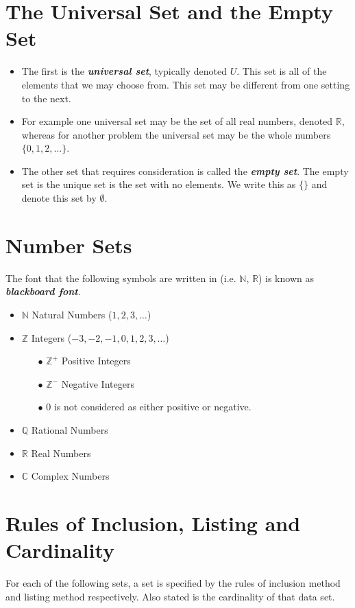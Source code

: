 \documentclass[a4paper,12pt]{article}
\begin{document}
\section*{The Universal Set and the Empty Set}
\begin{itemize}
	\item The first is the \textbf{\textit{universal set}}, typically denoted $U$. This set is all of the elements that we may choose from. This set may be different from one setting to the next. 
	
	\item For example one universal set may be the set of all real numbers, denoted $\mathbb{R}$, whereas for another problem the universal set may be the whole numbers $\{0, 1, 2,\ldots\}$.
	
	\item The other set that requires consideration is called the \textit{\textbf{empty set}}. The empty set is the unique set is the set with no elements. We write this as $\{ \}$ and denote this set by $\emptyset$.
\end{itemize}
\section*{Number Sets}
The font that the following symbols are written in (i.e. $\mathbb{N}$, $\mathbb{R}$) is known as \textit{\textbf{blackboard font}}.
\begin{itemize}
	\item $\mathbb{N}$ Natural Numbers ($1,2,3,\ldots$) 
	\item $\mathbb{Z}$ Integers ($-3,-2,-1,0,1,2,3, \ldots$)
	\begin{itemize}
		\item[$\bullet$] $\mathbb{Z}^{+}$ Positive Integers
		\item[$\bullet$] $\mathbb{Z}^{-}$ Negative Integers
		\item[$\bullet$] 0 is not considered as either positive or negative.
	\end{itemize}
	\item $\mathbb{Q}$ Rational Numbers
	\item $\mathbb{R}$ Real Numbers
	\item $\mathbb{C}$ Complex Numbers
\end{itemize}
\newpage
\section*{Rules of Inclusion, Listing and Cardinality}
For each of the following sets, a set is specified by the rules of inclusion method and listing method respectively. Also stated is the cardinality of that data set.
\end{document}
